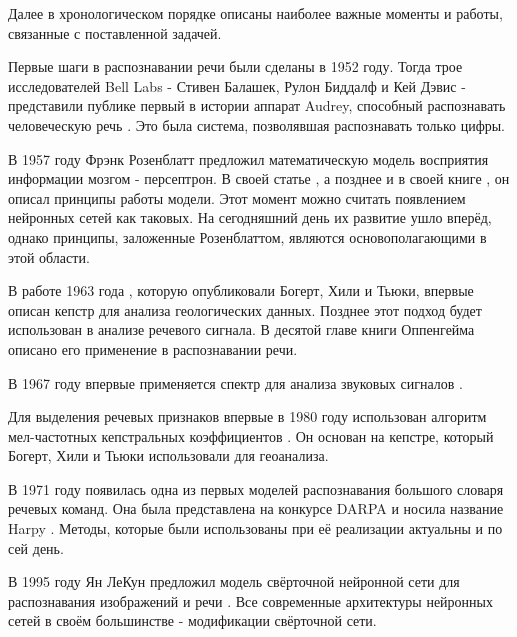 Далее в хронологическом порядке описаны наиболее важные моменты и работы, связанные с поставленной задачей.

Первые шаги в распознавании речи были сделаны в 1952 году. Тогда трое исследователей Bell Labs - Стивен Балашек, Рулон Биддалф и Кей Дэвис - представили публике первый в истории аппарат Audrey, способный распознавать человеческую речь \cite{Audrey}. Это была система, позволявшая распознавать только цифры. 

В 1957 году Фрэнк Розенблатт предложил математическую модель восприятия информации мозгом - персептрон. В своей статье \cite{PerceptronArticle}, а позднее и в своей книге \cite{PerceptronBook}, он описал принципы работы модели. Этот момент можно считать появлением нейронных сетей как таковых. На сегодняшний день их развитие ушло вперёд, однако принципы, заложенные Розенблаттом, являются основополагающими в этой области.

В работе 1963 года \cite{Cepstrum}, которую опубликовали Богерт, Хили и Тьюки, впервые описан кепстр для анализа геологических данных. Позднее этот подход будет использован в анализе речевого сигнала. В десятой главе книги Оппенгейма \cite{CeptrumExplanation} описано его применение в распознавании речи.

В 1967 году впервые применяется спектр для анализа звуковых сигналов \cite{Spectrum}.

Для выделения речевых признаков впервые в 1980 году использован алгоритм мел-частотных кепстральных коэффициентов \cite{MFCC}. Он основан на кепстре, который Богерт, Хили и Тьюки использовали для геоанализа.

В 1971 году появилась одна из первых моделей распознавания большого словаря речевых команд. Она была представлена на конкурсе DARPA и носила название Harpy \cite{Harpy}. Методы, которые были использованы при её реализации актуальны и по сей день.

В 1995 году Ян ЛеКун предложил модель свёрточной нейронной сети для распознавания изображений и речи \cite{CNN}. Все современные архитектуры нейронных сетей в своём большинстве - модификации свёрточной сети.